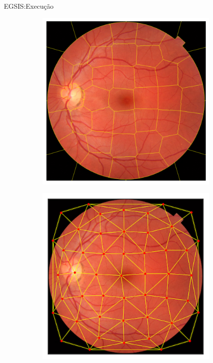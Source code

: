 \documentclass{templatebeamerufc/libs/ufc_format}
\begin{document}
\begin{frame}{EGSIS:\@ Execução}

  \begin{figure}[!h]
    \centering
    \caption{\label{fig:egsis-init}
      Construção de superpixels e a rede complexa no modelo EGSIS.\@
    }

    \begin{subfigure}[b]{0.45\textwidth}
      \centering
      \includegraphics[scale=0.45]{figuras/egsis-superpixels}
      \caption{\label{fig:egsis-superpixels}}
    \end{subfigure}
    \quad
    \begin{subfigure}[b]{0.45\textwidth}
      \centering
      \includegraphics[scale=0.442]{figuras/egsis-complex-networks}
      \caption{\label{fig:egsis-complex-networks}}
    \end{subfigure}
    \quad
  \end{figure}

\end{frame}
\end{document}
